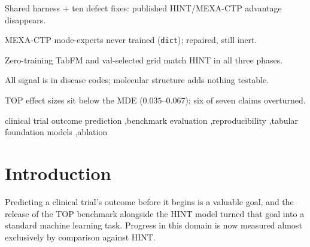 \documentclass[a4paper,fleqn]{cas-sc}
\begin{document}
\begin{abstract}
resolve. At $80\%$ power, the smallest difference this benchmark can detect is $0.035$--$0.067$
ROC-AUC, depending on the phase. Every between-model gain reported in this literature falls below
that limit and is therefore unverifiable at TOP's current size. Our own work shows how easily
such gains appear: we formed seven directional findings, of which six were overturned and one
narrowed under replication. One was an overestimate of seed noise, since HINT's five-seed
standard deviation is only $0.0024$. We conclude that improvement claims on TOP require multiple
seeds, validation-based selection, confidence intervals, a trivial baseline, and an explicit
minimum detectable effect. Without these, they are not verifiable.
\end{abstract}
\begin{highlights}
\item Shared harness + ten defect fixes: published HINT/MEXA-CTP advantage disappears.
\item MEXA-CTP mode-experts never trained (\texttt{dict}); repaired, still inert.
\item Zero-training TabFM and val-selected grid match HINT in all three phases.
\item All signal is in disease codes; molecular structure adds nothing testable.
\item TOP effect sizes sit below the MDE ($0.035$--$0.067$); six of seven claims overturned.
\end{highlights}
\begin{keywords}
clinical trial outcome prediction \sep benchmark evaluation \sep reproducibility \sep tabular foundation models \sep ablation
\end{keywords}
\maketitle
\section{Introduction}
\label{sec:intro}
Predicting a clinical trial's outcome before it begins is a valuable goal, and the release of the
TOP benchmark alongside the HINT model \citep{fu2022hint} turned that goal into a standard machine
learning task. Progress in this domain is now measured almost exclusively by comparison against
HINT.
\end{document}
